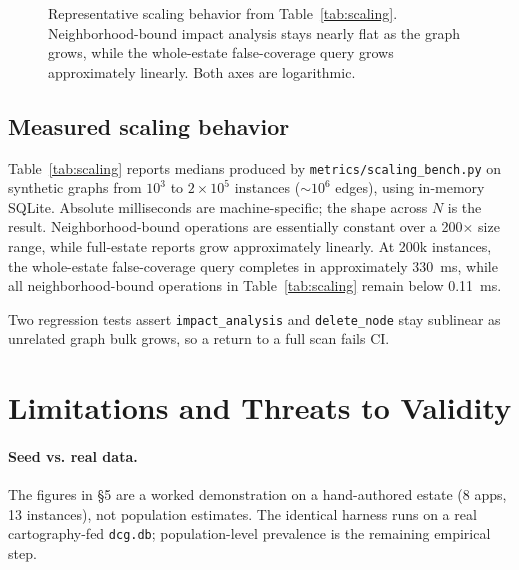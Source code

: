 \documentclass[10pt]{article}
\newcommand{\code}[1]{\texttt{#1}}
\begin{document}
\begin{figure}[H]
\centering
{}
\caption{Representative scaling behavior from Table~\ref{tab:scaling}. Neighborhood-bound impact analysis stays nearly flat as the graph grows, while the whole-estate false-coverage query grows approximately linearly. Both axes are logarithmic.}
\label{fig:scaling}
\end{figure}

\subsection{Measured scaling behavior}
Table~\ref{tab:scaling} reports medians produced by \code{metrics/scaling\_bench.py} on synthetic graphs from $10^3$ to $2\times10^5$ instances ($\sim10^6$ edges), using in-memory SQLite. Absolute milliseconds are machine-specific; the shape across $N$ is the result. Neighborhood-bound operations are essentially constant over a 200$\times$ size range, while full-estate reports grow approximately linearly. At 200k instances, the whole-estate false-coverage query completes in approximately 330~ms, while all neighborhood-bound operations in Table~\ref{tab:scaling} remain below 0.11~ms.

Two regression tests assert \code{impact\_analysis} and \code{delete\_node} stay sublinear as unrelated graph bulk grows, so a return to a full scan fails CI.

\section{Limitations and Threats to Validity}
\paragraph{Seed vs. real data.} The figures in \S5 are a worked demonstration on a hand-authored estate (8 apps, 13 instances), not population estimates. The identical harness runs on a real cartography-fed \code{dcg.db}; population-level prevalence is the remaining empirical step.
\end{document}
